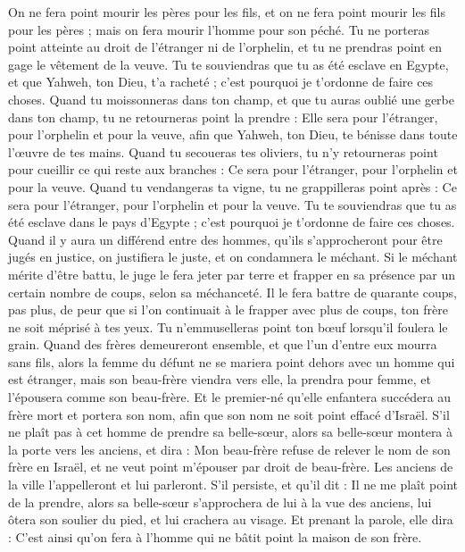 \begin{multicols}{2}
On ne fera point mourir les pères pour les fils, et on ne fera point mourir les fils pour les pères ; mais on fera mourir l’homme pour son péché.
Tu ne porteras point atteinte au droit de l'étranger ni de l'orphelin, et tu ne prendras point en gage le vêtement de la veuve.
Tu te souviendras que tu as été esclave en Egypte, et que Yahweh, ton Dieu, t'a racheté ; c'est pourquoi je t’ordonne de faire ces choses.
Quand tu moissonneras dans ton champ, et que tu auras oublié une gerbe dans ton champ, tu ne retourneras point la prendre : Elle sera pour l'étranger, pour l'orphelin et pour la veuve, afin que Yahweh, ton Dieu, te bénisse dans toute l’œuvre de tes mains.
Quand tu secoueras tes oliviers, tu n'y retourneras point pour cueillir ce qui reste aux branches : Ce sera pour l'étranger, pour l'orphelin et pour la veuve.
Quand tu vendangeras ta vigne, tu ne grappilleras point après : Ce sera pour l'étranger, pour l'orphelin et pour la veuve.
Tu te souviendras que tu as été esclave dans le pays d'Egypte ; c'est pourquoi je t’ordonne de faire ces choses.
\VerseOne{}Quand il y aura un différend entre des hommes, qu'ils s’approcheront pour être jugés en justice, on justifiera le juste, et on condamnera le méchant.
Si le méchant mérite d'être battu, le juge le fera jeter par terre et frapper en sa présence par un certain nombre de coups, selon sa méchanceté.
Il le fera battre de quarante coups, pas plus, de peur que si l’on continuait à le frapper avec plus de coups, ton frère ne soit méprisé à tes yeux.
Tu n'emmuselleras point ton bœuf lorsqu'il foulera le grain.
Quand des frères demeureront ensemble, et que l'un d'entre eux mourra sans fils, alors la femme du défunt ne se mariera point dehors avec un homme qui est étranger, mais son beau-frère viendra vers elle, la prendra pour femme, et l'épousera comme son beau-frère.
Et le premier-né qu'elle enfantera succédera au frère mort et portera son nom, afin que son nom ne soit point effacé d'Israël.
S'il ne plaît pas à cet homme de prendre sa belle-sœur, alors sa belle-sœur montera à la porte vers les anciens, et dira : Mon beau-frère refuse de relever le nom de son frère en Israël, et ne veut point m'épouser par droit de beau-frère.
Les anciens de la ville l'appelleront et lui parleront. S'il persiste, et qu'il dit : Il ne me plaît point de la prendre,
alors sa belle-sœur s'approchera de lui à la vue des anciens, lui ôtera son soulier du pied, et lui crachera au visage. Et prenant la parole, elle dira : C'est ainsi qu'on fera à l'homme qui ne bâtit point la maison de son frère.

\end{multicols}
